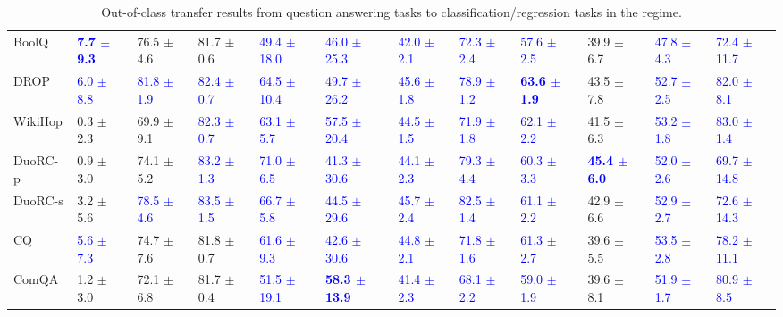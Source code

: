 \begin{landscape}
\begin{table}[t]
\begin{adjustbox}{max width=2\textwidth}
\begin{tabular}{ l l l l l  l l l l  l l l }
BoolQ & \textbf{\textcolor{blue}{7.7 $\pm$ 9.3}} & 76.5 $\pm$ 4.6 & 81.7 $\pm$ 0.6 & \textcolor{blue}{49.4 $\pm$ 18.0} & \textcolor{blue}{46.0 $\pm$ 25.3} & \textcolor{blue}{42.0 $\pm$ 2.1} & \textcolor{blue}{72.3 $\pm$ 2.4} & \textcolor{blue}{57.6 $\pm$ 2.5} & 39.9 $\pm$ 6.7 & \textcolor{blue}{47.8 $\pm$ 4.3} & \textcolor{blue}{72.4 $\pm$ 11.7}\\
DROP & \textcolor{blue}{6.0 $\pm$ 8.8} & \textcolor{blue}{81.8 $\pm$ 1.9} & \textcolor{blue}{82.4 $\pm$ 0.7} & \textcolor{blue}{64.5 $\pm$ 10.4} & \textcolor{blue}{49.7 $\pm$ 26.2} & \textcolor{blue}{45.6 $\pm$ 1.8} & \textcolor{blue}{78.9 $\pm$ 1.2} & \textbf{\textcolor{blue}{63.6 $\pm$ 1.9}} & 43.5 $\pm$ 7.8 & \textcolor{blue}{52.7 $\pm$ 2.5} & \textcolor{blue}{82.0 $\pm$ 8.1}\\
WikiHop & 0.3 $\pm$ 2.3 & 69.9 $\pm$ 9.1 & \textcolor{blue}{82.3 $\pm$ 0.7} & \textcolor{blue}{63.1 $\pm$ 5.7} & \textcolor{blue}{57.5 $\pm$ 20.4} & \textcolor{blue}{44.5 $\pm$ 1.5} & \textcolor{blue}{71.9 $\pm$ 1.8} & \textcolor{blue}{62.1 $\pm$ 2.2} & 41.5 $\pm$ 6.3 & \textcolor{blue}{53.2 $\pm$ 1.8} & \textcolor{blue}{83.0 $\pm$ 1.4}\\
DuoRC-p & 0.9 $\pm$ 3.0 & 74.1 $\pm$ 5.2 & \textcolor{blue}{83.2 $\pm$ 1.3} & \textcolor{blue}{71.0 $\pm$ 6.5} & \textcolor{blue}{41.3 $\pm$ 30.6} & \textcolor{blue}{44.1 $\pm$ 2.3} & \textcolor{blue}{79.3 $\pm$ 4.4} & \textcolor{blue}{60.3 $\pm$ 3.3} & \textbf{\textcolor{blue}{45.4 $\pm$ 6.0}} & \textcolor{blue}{52.0 $\pm$ 2.6} & \textcolor{blue}{69.7 $\pm$ 14.8}\\
DuoRC-s & 3.2 $\pm$ 5.6 & \textcolor{blue}{78.5 $\pm$ 4.6} & \textcolor{blue}{83.5 $\pm$ 1.5} & \textcolor{blue}{66.7 $\pm$ 5.8} & \textcolor{blue}{44.5 $\pm$ 29.6} & \textcolor{blue}{45.7 $\pm$ 2.4} & \textcolor{blue}{82.5 $\pm$ 1.4} & \textcolor{blue}{61.1 $\pm$ 2.2} & 42.9 $\pm$ 6.6 & \textcolor{blue}{52.9 $\pm$ 2.7} & \textcolor{blue}{72.6 $\pm$ 14.3}\\
CQ & \textcolor{blue}{5.6 $\pm$ 7.3} & 74.7 $\pm$ 7.6 & 81.8 $\pm$ 0.7 & \textcolor{blue}{61.6 $\pm$ 9.3} & \textcolor{blue}{42.6 $\pm$ 30.6} & \textcolor{blue}{44.8 $\pm$ 2.1} & \textcolor{blue}{71.8 $\pm$ 1.6} & \textcolor{blue}{61.3 $\pm$ 2.7} & 39.6 $\pm$ 5.5 & \textcolor{blue}{53.5 $\pm$ 2.8} & \textcolor{blue}{78.2 $\pm$ 11.1}\\
ComQA & 1.2 $\pm$ 3.0 & 72.1 $\pm$ 6.8 & 81.7 $\pm$ 0.4 & \textcolor{blue}{51.5 $\pm$ 19.1} & \textbf{\textcolor{blue}{58.3 $\pm$ 13.9}} & \textcolor{blue}{41.4 $\pm$ 2.3} & \textcolor{blue}{68.1 $\pm$ 2.2} & \textcolor{blue}{59.0 $\pm$ 1.9} & 39.6 $\pm$ 8.1 & \textcolor{blue}{51.9 $\pm$ 1.7} & \textcolor{blue}{80.9 $\pm$ 8.5}\\
\bottomrule
\end{tabular}
\end{adjustbox}
\caption{Out-of-class transfer results from question answering tasks to classification/regression tasks in the  regime.}
\label{tbla7b}
\end{table}
\end{landscape}